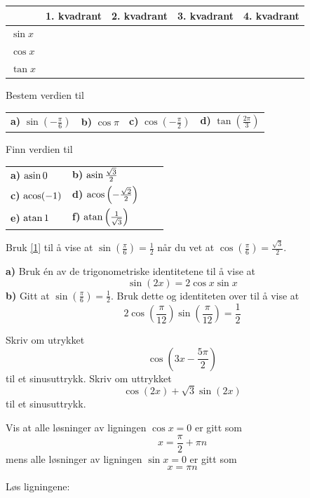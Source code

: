 \begin{tabular}{@{}l|l| l| l|l|}
&1. kvadrant & 2. kvadrant & 3. kvadrant & 4. kvadrant\\ \hline
$ \sin x $& & & &\\ \hline
$ \cos x $& & & &\\ \hline
$ \tan x $& & & &\\\hline
\end{tabular}

Bestem verdien til\os
\begin{tabular}{@{}l l l l }
\textbf{a)} $ \sin\left(-\frac{\pi}{6}\right) $ &\quad \textbf{b)} $ \cos \pi $ &\quad \textbf{c)} $ \cos\left(-\frac{\pi}{2}\right) $&\quad \textbf{d)} $ \tan\left(\frac{2\pi}{3}\right) $
\end{tabular}

Finn verdien til\\ \renewcommand{\arraystretch}{1.7}
\begin{tabular}{@{}l l l l }	
\textbf{a)} $ \operatorname{asin} 0 $ &\quad\textbf{b)} $ \operatorname{asin} \frac{\sqrt{3}}{2} $ \\
 \textbf{c)} $ \operatorname{acos} (-1) $ &\quad\textbf{d)} $ \operatorname{acos} \left(-\frac{\sqrt{2}}{2}\right) $ \\
 \textbf{e)} $ \operatorname{atan} 1 $ &\quad\textbf{f)} $ \operatorname{atan} \left(\frac{1}{\sqrt{3}}\right) $
\end{tabular}\renewcommand{\arraystretch}{1}

Bruk \eqref{1} til å vise at $ {\sin\left(\frac{\pi}{6}\right)=\frac{1}{2}} $ når du vet at $ \cos\left(\frac{\pi}{6}\right)=\frac{\sqrt{3}}{2} $.

\textbf{a)} Bruk én av de trigonometriske identitetene til å vise at
\[  \sin (2x)=2\cos x\sin x \]
\textbf{b)} Gitt at $ {\sin \left(\frac{\pi}{6}\right)=\frac{1}{2}} $. Bruk dette og identiteten over til å vise at
\[ 2\cos \left(\frac{\pi}{12}\right)\sin \left(\frac{\pi}{12}\right) = \frac{1}{2} \]

Skriv om utrykket
\[ \cos \left(3x-\frac{5\pi}{2}\right) \]
til et sinusuttrykk.
\newpage
{}
Skriv om uttrykket \[ \cos( 2x) + \sqrt 3\sin (2x) \]
til et sinusuttrykk.

\nes

Vis at alle løsninger av ligningen $ \cos x=0 $ er gitt som
\[ x = \frac{\pi}{2}+\pi n \]
mens alle løsninger av ligningen $ \sin x = 0 $ er gitt som
\[ x = \pi n \]\vds \vs

Løs ligningene:\os

